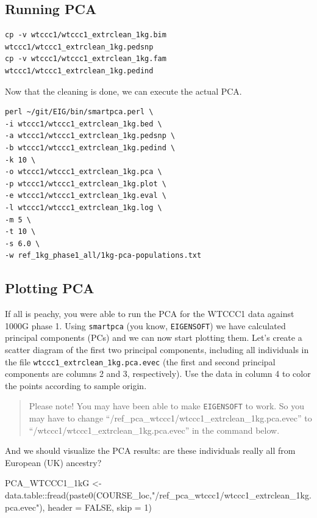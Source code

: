 \documentclass[
]{book}
\newenvironment{Shaded}{\begin{snugshade}}{\end{snugshade}}
\newcommand{\AttributeTok}[1]{\textcolor[rgb]{0.77,0.63,0.00}{#1}}
\newcommand{\ConstantTok}[1]{\textcolor[rgb]{0.00,0.00,0.00}{#1}}
\newcommand{\DecValTok}[1]{\textcolor[rgb]{0.00,0.00,0.81}{#1}}
\newcommand{\FunctionTok}[1]{\textcolor[rgb]{0.00,0.00,0.00}{#1}}
\newcommand{\NormalTok}[1]{#1}
\newcommand{\OtherTok}[1]{\textcolor[rgb]{0.56,0.35,0.01}{#1}}
\newcommand{\SpecialCharTok}[1]{\textcolor[rgb]{0.00,0.00,0.00}{#1}}
\newcommand{\StringTok}[1]{\textcolor[rgb]{0.31,0.60,0.02}{#1}}
\begin{document}
\hypertarget{running-pca-1}{%
\subsection{Running PCA}\label{running-pca-1}}

\begin{verbatim}
cp -v wtccc1/wtccc1_extrclean_1kg.bim wtccc1/wtccc1_extrclean_1kg.pedsnp
cp -v wtccc1/wtccc1_extrclean_1kg.fam wtccc1/wtccc1_extrclean_1kg.pedind
\end{verbatim}

Now that the cleaning is done, we can execute the actual PCA.

\begin{verbatim}
perl ~/git/EIG/bin/smartpca.perl \
-i wtccc1/wtccc1_extrclean_1kg.bed \
-a wtccc1/wtccc1_extrclean_1kg.pedsnp \
-b wtccc1/wtccc1_extrclean_1kg.pedind \
-k 10 \
-o wtccc1/wtccc1_extrclean_1kg.pca \
-p wtccc1/wtccc1_extrclean_1kg.plot \
-e wtccc1/wtccc1_extrclean_1kg.eval \
-l wtccc1/wtccc1_extrclean_1kg.log \
-m 5 \
-t 10 \
-s 6.0 \
-w ref_1kg_phase1_all/1kg-pca-populations.txt
\end{verbatim}

\hypertarget{plotting-pca}{%
\subsection{Plotting PCA}\label{plotting-pca}}

If all is peachy, you were able to run the PCA for the WTCCC1 data against 1000G phase 1. Using \texttt{smartpca} (you know, \texttt{EIGENSOFT}) we have calculated principal components (PCs) and we can now start plotting them. Let's create a scatter diagram of the first two principal components, including all individuals in the file \texttt{wtccc1\_extrclean\_1kg.pca.evec} (the first and second principal components are columns 2 and 3, respectively). Use the data in column 4 to color the points according to sample origin.

\begin{quote}
Please note! You may have been able to make \texttt{EIGENSOFT} to work. So you may have to change ``/ref\_pca\_wtccc1/wtccc1\_extrclean\_1kg.pca.evec'' to ``/wtccc1/wtccc1\_extrclean\_1kg.pca.evec'' in the command below.
\end{quote}

And we should visualize the PCA results: are these individuals really all from European (UK) ancestry?

\begin{Shaded}
\begin{Highlighting}[]
\NormalTok{PCA\_WTCCC1\_1kG }\OtherTok{\textless{}{-}}\NormalTok{ data.table}\SpecialCharTok{::}\FunctionTok{fread}\NormalTok{(}\FunctionTok{paste0}\NormalTok{(COURSE\_loc,}\StringTok{"/ref\_pca\_wtccc1/wtccc1\_extrclean\_1kg.pca.evec"}\NormalTok{), }\AttributeTok{header =} \ConstantTok{FALSE}\NormalTok{, }\AttributeTok{skip =} \DecValTok{1}\NormalTok{)}
\end{Highlighting}
\end{Shaded}
\end{document}
